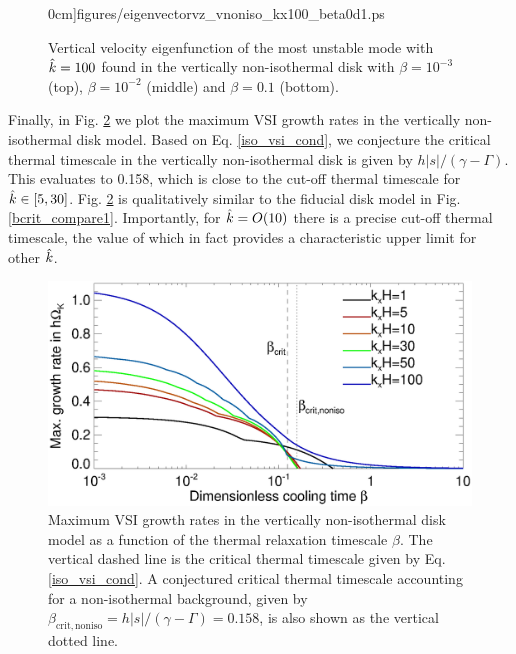 \begin{figure}
  0cm]{figures/eigenvectorvz_vnoniso_kx100_beta0d1.ps}
  \caption{Vertical velocity eigenfunction of the most unstable mode
    with $\hat{k}=100$ found in the vertically non-isothermal disk with
    $\beta = 10^{-3}$ (top), $\beta=10^{-2}$ (middle) and $\beta=0.1$
    (bottom). 
    \label{compare_eigenvz_vnoniso_kx100}}
\end{figure}
  
Finally, in Fig. \ref{bcrit_compare2} we plot the maximum VSI growth
rates in the vertically non-isothermal disk model. Based on 
Eq. \ref{iso_vsi_cond}, we conjecture the critical 
thermal timescale in the vertically non-isothermal disk is 
given by $ h|s|/(\gamma - \Gamma)$. This 
evaluates to 0.158, which is close to the cut-off thermal timescale
for $\hat{k}\in[5,30]$. Fig. \ref{bcrit_compare2} is qualitatively 
similar to the fiducial disk model in
Fig. \ref{bcrit_compare1}. Importantly, for $\hat{k}=O(10)$ there is a
precise cut-off thermal timescale, the value of which in fact provides a  
characteristic upper limit for other $\hat{k}$. 

\begin{figure}
  \includegraphics[width=\linewidth]{figures/gcorr_compare_vnoniso_maxrate} 
  \caption{Maximum VSI growth rates in the vertically non-isothermal disk
    model as a function of the thermal relaxation timescale
    $\beta$. The vertical dashed line is the critical thermal
    timescale given by Eq. \ref{iso_vsi_cond}. A conjectured critical thermal
    timescale accounting for a non-isothermal background, given by 
    $\beta_\mathrm{crit,noniso}= h|s|/(\gamma-\Gamma)=0.158$,  
    is also shown as the vertical dotted line. 
    \label{bcrit_compare2}}   
\end{figure} 



